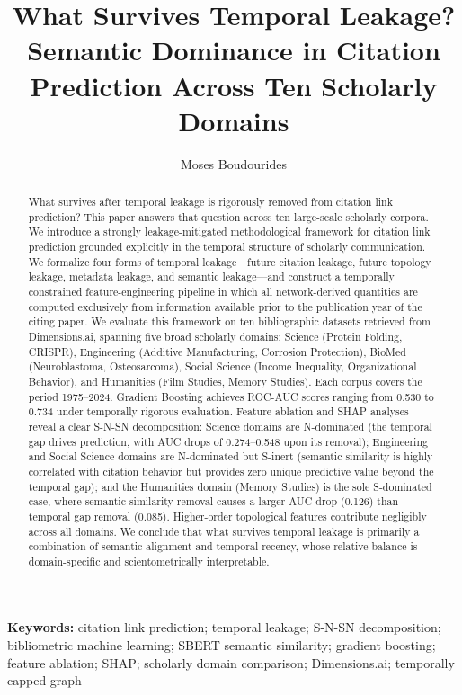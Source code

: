 \documentclass[11pt,a4paper]{article}
\title{What Survives Temporal Leakage?\\Semantic Dominance in Citation Prediction Across Ten Scholarly Domains}
\author{Moses Boudourides}
\affil{School of Professional Studies, Northwestern University, Evanston, IL, USA%
\authorcr\texttt{Moses.Boudourides@northwestern.edu}}
\date{}
\begin{document}
\sloppy

\maketitle

\begin{abstract}
What survives after temporal leakage is rigorously removed from citation link prediction? This paper answers that question across ten large-scale scholarly corpora. We introduce a strongly leakage-mitigated methodological framework for citation link prediction grounded explicitly in the temporal structure of scholarly communication. We formalize four forms of temporal leakage---future citation leakage, future topology leakage, metadata leakage, and semantic leakage---and construct a temporally constrained feature-engineering pipeline in which all network-derived quantities are computed exclusively from information available prior to the publication year of the citing paper. We evaluate this framework on ten bibliographic datasets retrieved from Dimensions.ai, spanning five broad scholarly domains: Science (Protein Folding, CRISPR), Engineering (Additive Manufacturing, Corrosion Protection), BioMed (Neuroblastoma, Osteosarcoma), Social Science (Income Inequality, Organizational Behavior), and Humanities (Film Studies, Memory Studies). Each corpus covers the period 1975--2024. Gradient Boosting achieves ROC-AUC scores ranging from 0.530 to 0.734 under temporally rigorous evaluation. Feature ablation and SHAP analyses reveal a clear S-N-SN decomposition: Science domains are N-dominated (the temporal gap drives prediction, with AUC drops of 0.274--0.548 upon its removal); Engineering and Social Science domains are N-dominated but S-inert (semantic similarity is highly correlated with citation behavior but provides zero unique predictive value beyond the temporal gap); and the Humanities domain (Memory Studies) is the sole S-dominated case, where semantic similarity removal causes a larger AUC drop (0.126) than temporal gap removal (0.085). Higher-order topological features contribute negligibly across all domains. We conclude that what survives temporal leakage is primarily a combination of semantic alignment and temporal recency, whose relative balance is domain-specific and scientometrically interpretable.
\end{abstract}

\noindent\textbf{Keywords:} citation link prediction; temporal leakage; S-N-SN decomposition; bibliometric machine learning; SBERT semantic similarity; gradient boosting; feature ablation; SHAP; scholarly domain comparison; Dimensions.ai; temporally capped graph
\end{document}
